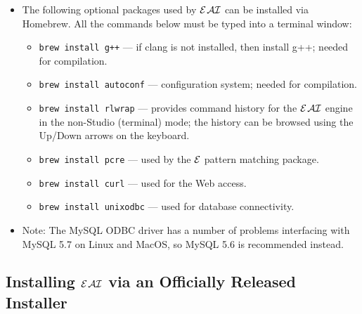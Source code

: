 \documentclass[11pt]{article}
\newcommand{\ERGO}{\mbox{\ensuremath{\cal{E}}\smaller{{\sc{RGO}}}}\xspace}
\newcommand{\ERGOAI}{\mbox{{\ensuremath{\cal{E}}\smaller{{\sc{RGO}}}}\ensuremath{\cal{AI}}}\xspace}
\begin{document}
\begin{itemize}
\begin{itemize}
\begin{itemize}
\begin{itemize}
        \texttt{ruby -e "\$(curl -fsSL\\
          \hspace*{2mm}
          https://raw.githubusercontent.com/Homebrew/install/master/install)}
        \\
        then hit \texttt{<Enter>}.
      \item Type \texttt{brew doctor} 
        to verify that the installation was successful.
      \end{itemize}
    \item The following optional packages used by \ERGOAI can be installed via
      Homebrew. All the commands below must be typed into a terminal window:
      
    \begin{itemize}
    \item \texttt{brew install g++} --- if clang is not installed, then
      install g++; needed for compilation.
    \item \texttt{brew install autoconf} --- configuration system; needed for
      compilation.
    \item \texttt{brew install rlwrap} --- provides command history for the
      \ERGOAI engine in the non-Studio (terminal) mode; the history can be
      browsed using the Up/Down arrows on the keyboard.
    \item \texttt{brew install pcre} --- used by the \ERGO pattern matching
      package.
    \item \texttt{brew install curl} --- used for the Web access.
    \item \texttt{brew install unixodbc} --- used for database connectivity.
    \end{itemize}
  \item Note: The MySQL ODBC driver has a number of problems interfacing
    with MySQL 5.7 on Linux and MacOS, so MySQL 5.6 is recommended instead.
  \end{itemize}
\end{itemize}
\end{itemize}

\subsection{Installing \ERGOAI via an Officially Released Installer}\label{sec-install-release}
\end{document}
